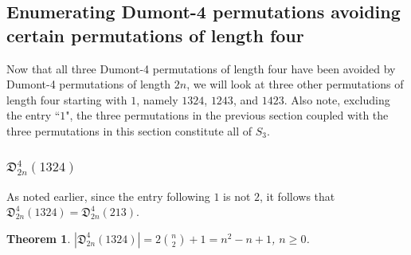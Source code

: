 \documentclass[
final
]{dmtcs-episciences}
\newtheorem{theorem}{Theorem}[section]%
\theoremstyle{definition}
\theoremstyle{remark}
\begin{document}

\subsection {Enumerating Dumont-4 permutations avoiding certain permutations of length four}

Now that all three Dumont-4 permutations of length four have been avoided by Dumont-4 permutations of length $2n$, we will look at three other permutations of length four starting with $1$, namely $1324$, $1243$, and $1423$.  Also note, excluding the entry ``$1$", the three permutations in the previous section coupled with the three permutations in this section constitute all of $S_3$.

\subsubsection{$\mathfrak{D}^4_{2n}(1324)$}

As noted earlier, since the entry following $1$ is not $2$, it follows that $\mathfrak{D}^4_{2n}(1324)=\mathfrak{D}^4_{2n}(213)$.

\begin{theorem}
$|\mathfrak{D}^4_{2n}(1324)| = 2 \binom{n}{2} + 1 = n^2 - n + 1$,  $n \ge 0$.
\end{theorem}
\end{document}
